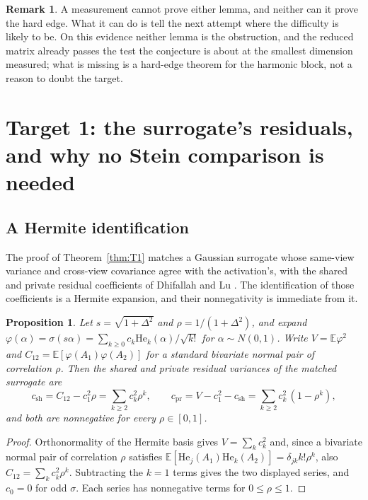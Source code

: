 \documentclass[11pt]{article}
\newtheorem{proposition}[theorem]{Proposition}
\theoremstyle{definition}
\newtheorem{remark}[theorem]{Remark}
\newcommand{\E}{\mathbb{E}}
\begin{document}
\begin{remark}
A measurement cannot prove either lemma, and neither can it prove the hard edge. What it can do is
tell the next attempt where the difficulty is likely to be. On this evidence neither lemma is the
obstruction, and the reduced matrix already passes the test the conjecture is about at the smallest
dimension measured; what is missing is a hard-edge theorem for the harmonic block, not a reason to
doubt the target.
\end{remark}

\section{Target 1: the surrogate's residuals, and why no Stein comparison is needed}\label{sec:t1}

\subsection{A Hermite identification}

The proof of Theorem~\ref{thm:T1} matches a Gaussian surrogate whose same-view variance and cross-view
covariance agree with the activation's, with the shared and private residual coefficients of
Dhifallah and Lu \cite{DhifallahLu}. The identification of those coefficients is a Hermite
expansion, and their nonnegativity is immediate from it.

\begin{proposition}\label{prop:hermite}
Let $s=\sqrt{1+\Delta^2}$ and $\rho=1/(1+\Delta^2)$, and expand $\varphi(\alpha)=\sigma(s\alpha)
=\sum_{k\ge0}c_k\mathrm{He}_k(\alpha)/\sqrt{k!}$ for $\alpha\sim N(0,1)$. Write $V=\E\varphi^2$ and
$C_{12}=\E[\varphi(A_1)\varphi(A_2)]$ for a standard bivariate normal pair of correlation $\rho$.
Then the shared and private residual variances of the matched surrogate are
\[
c_{\mathrm{sh}}=C_{12}-c_1^2\rho=\sum_{k\ge2}c_k^2\rho^k,
\qquad
c_{\mathrm{pr}}=V-c_1^2-c_{\mathrm{sh}}=\sum_{k\ge2}c_k^2\,(1-\rho^k),
\]
and both are nonnegative for every $\rho\in[0,1]$.
\end{proposition}

\begin{proof}
Orthonormality of the Hermite basis gives $V=\sum_k c_k^2$ and, since a bivariate normal pair of
correlation $\rho$ satisfies $\E[\mathrm{He}_j(A_1)\mathrm{He}_k(A_2)]=\delta_{jk}k!\rho^k$, also
$C_{12}=\sum_k c_k^2\rho^k$. Subtracting the $k=1$ terms gives the two displayed series, and
$c_0=0$ for odd $\sigma$. Each series has nonnegative terms for $0\le\rho\le1$.
\end{proof}
\end{document}
